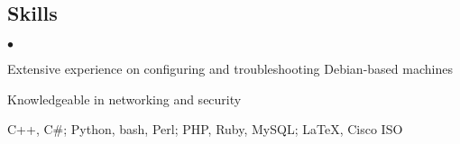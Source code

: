\documentclass[margin,line]{res}
\newenvironment{list2}{
  \begin{list}{$\bullet$}{%
      \setlength{\itemsep}{0in}
      \setlength{\parsep}{0in} \setlength{\parskip}{0in}
      \setlength{\topsep}{0in} \setlength{\partopsep}{0in} 
      \setlength{\leftmargin}{0.18in}}}{\end{list}}
\begin{document}
\begin{resume}
\section{\sc Skills} 
\begin{list2}
\item Extensive experience on configuring and troubleshooting Debian-based machines
\item Knowledgeable in networking and security
\item C++, C\#; Python, bash, Perl; PHP, Ruby, MySQL; \LaTeX, Cisco ISO
\end{list2}


%
%


\end{resume}
\end{document}
